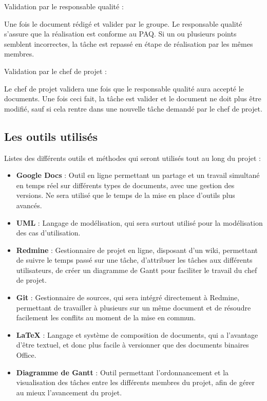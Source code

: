 Validation par le responsable qualité :

Une fois le document rédigé et valider par le groupe. Le responsable qualité s'assure que la réalisation est conforme au PAQ. Si un ou plusieurs points semblent incorrectes, la tâche est repassé en étape de réalisation par les mêmes membres.

Validation par le chef de projet :

Le chef de projet validera une fois que le responsable qualité aura accepté le documents. Une fois ceci fait, la tâche est valider et le document ne doit plus être modifié, sauf si cela rentre dans une nouvelle tâche demandé par le chef de projet.

    \subsection{Les outils utilisés}

Listes des différents outils et méthodes qui seront utilisés tout au long du projet :

\begin{itemize}
\item \textbf{Google Docs} : Outil en ligne permettant un partage et un travail simultané en temps réel sur différents types de documents, avec une gestion des versions. Ne sera utilisé que le temps de la mise en place d'outils plus avancés.
\item \textbf{UML} : Langage de modélisation, qui sera surtout utilisé pour la modélisation des cas d'utilisation.
\item \textbf{Redmine} : Gestionnaire de projet en ligne, disposant d'un wiki, permettant de suivre le temps passé sur une tâche, d'attribuer les tâches aux différents utilisateurs, de créer un  diagramme de Gantt pour faciliter le travail du chef de projet.
\item \textbf{Git} : Gestionnaire de sources, qui sera intégré directement à Redmine, permettant de travailler à plusieurs sur un même document et de résoudre facilement les conflits au moment de la mise en commun.
\item \textbf{LaTeX} : Langage et système de composition de documents, qui a l'avantage d'être textuel, et donc plus facile à versionner que des documents binaires Office.
\item \textbf{Diagramme de Gantt } : Outil permettant l'ordonnancement et la visualisation des tâches entre les différents membres du projet, afin de gérer au mieux l'avancement du projet.
\end{itemize}

